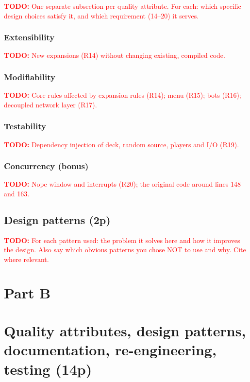 \documentclass[12pt,a4paper]{article}
\newcommand{\todo}[1]{\textcolor{red}{\textbf{TODO:} #1}}   %
\begin{document}
\todo{One separate subsection per quality attribute. For each: which specific design
choices satisfy it, and which requirement (14--20) it serves.}

\subsubsection{Extensibility}
\todo{New expansions (R14) without changing existing, compiled code.}

\subsubsection{Modifiability}
\todo{Core rules affected by expansion rules (R14); menu (R15); bots (R16); decoupled
network layer (R17).}

\subsubsection{Testability}
\todo{Dependency injection of deck, random source, players and I/O (R19).}

\subsubsection{Concurrency (bonus)}
\todo{Nope window and interrupts (R20); the original code around lines 148 and 163.}

\subsection{Design patterns (2p)}
\label{sec:q2d}

\todo{For each pattern used: the problem it solves here and how it improves the design.
Also say which obvious patterns you chose NOT to use and why. Cite
\cite{gamma1994} where relevant.}

\section*{Part B}

\section{Quality attributes, design patterns, documentation, re-engineering, testing (14p)}
\label{sec:q3}
\end{document}
